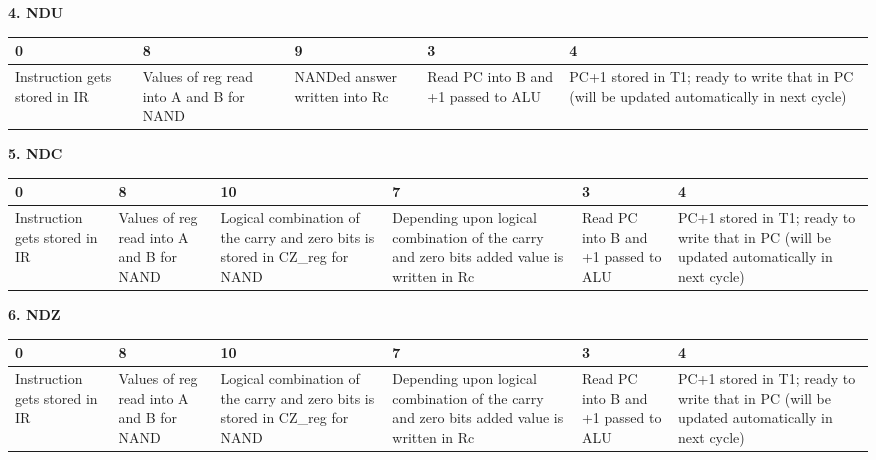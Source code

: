 \documentclass[11pt,fleqn,oneside]{book} %
\begin{document}
\vspace{1cm}

\textbf{4. NDU }
\begin{center}
 \begin{tabular}{ | m{5em} | m{5em} | m{5em} | m{7em} | m{7em} | } 
 \hline
 0 & 8 & 9 & 3 & 4 \\ [0.5ex]
 \hline
 Instruction gets stored in IR & Values of reg read into A and B for NAND & NANDed answer written into Rc & Read PC into B and +1 passed to ALU & PC+1 stored in T1; ready to write that in PC (will be updated automatically in next cycle)  \\ [1ex]
 \hline
\end{tabular}
\end{center}

\vspace{1cm}

\textbf{5. NDC }
\begin{center}
 \begin{tabular}{ | m{5em} | m{5em} | m{5em} | m{7em} | m{5em} | m{7em} | } 
 \hline
 0 & 8 & 10 & 7 & 3 & 4 \\ [0.5ex]
 \hline
 Instruction gets stored in IR & Values of reg read into A and B for NAND & Logical combination of the carry and zero bits is stored in CZ\_reg for NAND & Depending upon logical combination of the carry and zero bits added value is written in Rc & Read PC into B and +1 passed to ALU & PC+1 stored in T1; ready to write that in PC (will be updated automatically in next cycle)  \\ [1ex]
 \hline
\end{tabular}
\end{center}



\textbf{6. NDZ }
\begin{center}
 \begin{tabular}{ | m{5em} | m{5em} | m{5em} | m{7em} | m{5em} | m{7em} | } 
 \hline
 0 & 8 & 10 & 7 & 3 & 4 \\ [0.5ex]
 \hline
 Instruction gets stored in IR & Values of reg read into A and B for NAND & Logical combination of the carry and zero bits is stored in CZ\_reg for NAND & Depending upon logical combination of the carry and zero bits added value is written in Rc & Read PC into B and +1 passed to ALU & PC+1 stored in T1; ready to write that in PC (will be updated automatically in next cycle)  \\ [1ex]
 \hline
\end{tabular}
\end{center}
\end{document}
